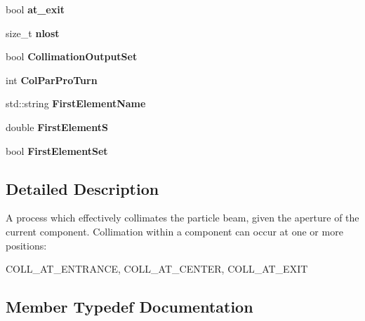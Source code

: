 \begin{DoxyCompactItemize}
bool {\bfseries at\+\_\+exit}
\item 
\mbox{\label{classParticleTracking_1_1CollimateParticleProcess_ada6ce19e4650dc38c70317c49e6a4869}} 
size\+\_\+t {\bfseries nlost}
\item 
\mbox{\label{classParticleTracking_1_1CollimateParticleProcess_a594a82c8e53c9fc5ed2667c87d8f8bb9}} 
bool {\bfseries Collimation\+Output\+Set}
\item 
\mbox{\label{classParticleTracking_1_1CollimateParticleProcess_a3ed5b3d85099b62085da0b2edd2993e7}} 
int {\bfseries Col\+Par\+Pro\+Turn}
\item 
\mbox{\label{classParticleTracking_1_1CollimateParticleProcess_a62aaf5e4ceb58f6b70a90549d712fffe}} 
std\+::string {\bfseries First\+Element\+Name}
\item 
\mbox{\label{classParticleTracking_1_1CollimateParticleProcess_a925643d41849280b5fbd885e06f3fbc3}} 
double {\bfseries First\+ElementS}
\item 
\mbox{\label{classParticleTracking_1_1CollimateParticleProcess_ae5e80a65d12aba3ab2b80b65ab91cf54}} 
bool {\bfseries First\+Element\+Set}
\end{DoxyCompactItemize}


\subsection{Detailed Description}
A process which effectively collimates the particle beam, given the aperture of the current component. Collimation within a component can occur at one or more positions\+:

C\+O\+L\+L\+\_\+\+A\+T\+\_\+\+E\+N\+T\+R\+A\+N\+CE, C\+O\+L\+L\+\_\+\+A\+T\+\_\+\+C\+E\+N\+T\+ER, C\+O\+L\+L\+\_\+\+A\+T\+\_\+\+E\+X\+IT 

\subsection{Member Typedef Documentation}
\mbox{\label{classParticleTracking_1_1CollimateParticleProcess_ac2ecc4232755ca120567b420af5b1dc8}} 
